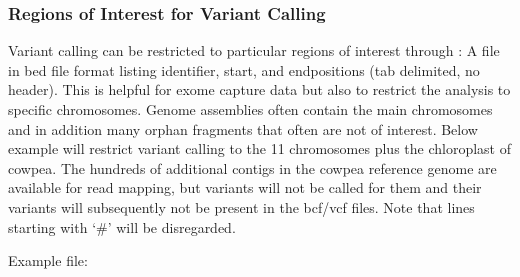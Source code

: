 \documentclass[letterpaper,10pt,english]{sphinxhowto}
\begin{document}
\subsubsection{Regions of Interest for Variant Calling}
\label{\detokenize{index:regions-of-interest-for-variant-calling}}
Variant calling can be restricted to particular regions of interest through : A file in bed file format listing identifier, start\sphinxhyphen{}, and end\sphinxhyphen{}positions (tab delimited, no header). This is helpful for exome capture data but also to restrict the analysis to specific chromosomes. Genome assemblies often contain the main chromosomes and in addition many orphan fragments that often are not of interest.
Below example will restrict variant calling to the 11 chromosomes plus the chloroplast of cowpea. The hundreds of additional contigs in the cowpea reference genome are available for read mapping, but variants will not be called for them and their variants will subsequently not be present in the bcf/vcf files. Note that lines starting with ‘\#’ will be disregarded.

Example  file:

\begin{sphinxVerbatim}[commandchars=\\\{\}]
  
  
  
  
  
  
  
  
  
  
  
  
\end{sphinxVerbatim}
\end{document}
